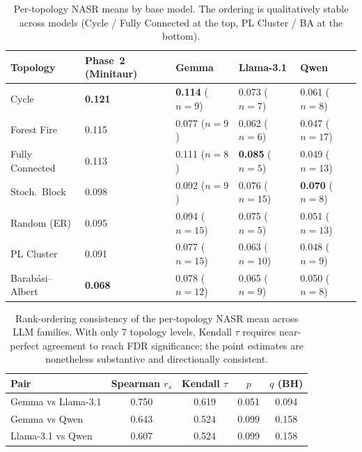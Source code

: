\documentclass[11pt]{article}
\begin{document}
\begin{table}[h]
\centering
\small
\begin{tabular}{lllll}
\toprule
Topology & Phase~2 (Minitaur) & Gemma & Llama-3.1 & Qwen \\
\midrule
Cycle             & \textbf{0.121}     & \textbf{0.114} ($n=9$)  & 0.073 ($n=7$)  & 0.061 ($n=8$)  \\
Forest Fire       & 0.115              & 0.077 ($n=9$)           & 0.062 ($n=6$)  & 0.047 ($n=17$) \\
Fully Connected   & 0.113              & 0.111 ($n=8$)           & \textbf{0.085} ($n=5$) & 0.049 ($n=13$) \\
Stoch.\ Block     & 0.098              & 0.092 ($n=9$)           & 0.076 ($n=15$) & \textbf{0.070} ($n=8$) \\
Random (ER)       & 0.095              & 0.094 ($n=15$)          & 0.075 ($n=5$)  & 0.051 ($n=13$) \\
PL Cluster        & 0.091              & 0.077 ($n=15$)          & 0.063 ($n=10$) & 0.048 ($n=9$)  \\
Barab\'{a}si--Albert & \textbf{0.068}  & 0.078 ($n=12$)          & 0.065 ($n=9$)  & 0.050 ($n=8$)  \\
\bottomrule
\end{tabular}
\caption{Per-topology NASR means by base model. The ordering is qualitatively stable across models (Cycle / Fully Connected at the top, PL Cluster / BA at the bottom).}
\label{tab:phase3_per_topology_models}
\end{table}

\begin{table}[h]
\centering
\small
\begin{tabular}{lcccc}
\toprule
Pair & Spearman $r_s$ & Kendall $\tau$ & $p$ & $q$ (BH) \\
\midrule
Gemma vs Llama-3.1 & 0.750 & 0.619 & 0.051 & 0.094 \\
Gemma vs Qwen      & 0.643 & 0.524 & 0.099 & 0.158 \\
Llama-3.1 vs Qwen  & 0.607 & 0.524 & 0.099 & 0.158 \\
\bottomrule
\end{tabular}
\caption{Rank-ordering consistency of the per-topology NASR mean across LLM families. With only 7 topology levels, Kendall $\tau$ requires near-perfect agreement to reach FDR significance; the point estimates are nonetheless substantive and directionally consistent.}
\label{tab:phase3_rank_models}
\end{table}
\end{document}
